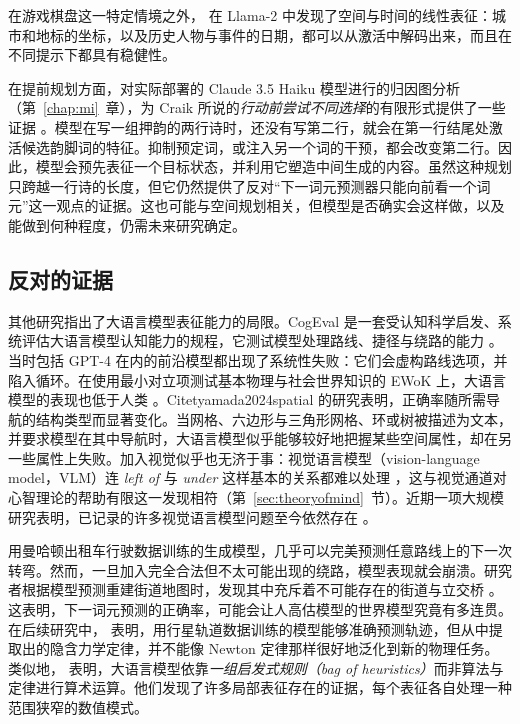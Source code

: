 在游戏棋盘这一特定情境之外，\citet{gurnee2024language} 在 Llama-2 中发现了空间与时间的线性表征：城市和地标的坐标，以及历史人物与事件的日期，都可以从激活中解码出来，而且在不同提示下都具有稳健性。

在提前规划方面，对实际部署的 Claude 3.5 Haiku 模型进行的归因图分析（第~\ref{chap:mi}~章），为 Craik 所说的\emph{行动前尝试不同选择}的有限形式提供了一些证据 \citep{lindsey2025biology}。模型在写一组押韵的两行诗时，还没有写第二行，就会在第一行结尾处激活候选韵脚词的特征。抑制预定词，或注入另一个词的干预，都会改变第二行。因此，模型会预先表征一个目标状态，并利用它塑造中间生成的内容。虽然这种规划只跨越一行诗的长度，但它仍然提供了反对“下一词元预测器只能向前看一个词元”这一观点的证据。这也可能与空间规划相关，但模型是否确实会这样做，以及能做到何种程度，仍需未来研究确定。

\subsection{反对的证据}
其他研究指出了大语言模型表征能力的局限。CogEval 是一套受认知科学启发、系统评估大语言模型认知能力的规程，它测试模型处理路线、捷径与绕路的能力 \citep{momennejad2023cogmap}。当时包括 GPT-4 在内的前沿模型都出现了系统性失败：它们会虚构路线选项，并陷入循环。在使用最小对立项测试基本物理与社会世界知识的 EWoK 上，大语言模型的表现也低于人类 \citep{ivanova2025elementsworldknowledgeewok}。Citet{yamada2024spatial} 的研究表明，正确率随所需导航的结构类型而显著变化。当网格、六边形与三角形网格、环或树被描述为文本，并要求模型在其中导航时，大语言模型似乎能够较好地把握某些空间属性，却在另一些属性上失败。加入视觉似乎也无济于事：视觉语言模型（vision-language model，VLM）连 {\em left of} 与 {\em under} 这样基本的关系都难以处理 \citep{kamath2023whats}，这与视觉通道对心智理论的帮助有限这一发现相符（第~\ref{sec:theoryofmind}~节）。近期一项大规模研究表明，已记录的许多视觉语言模型问题至今依然存在 \citep{wang2026monos}。

用曼哈顿出租车行驶数据训练的生成模型，几乎可以完美预测任意路线上的下一次转弯。然而，一旦加入完全合法但不太可能出现的绕路，模型表现就会崩溃。研究者根据模型预测重建街道地图时，发现其中充斥着不可能存在的街道与立交桥 \citep{vafa2024eval}。这表明，下一词元预测的正确率，可能会让人高估模型的世界模型究竟有多连贯。在后续研究中，\citet{vafa2025foundation} 表明，用行星轨道数据训练的模型能够准确预测轨迹，但从中提取出的隐含力学定律，并不能像 Newton 定律那样很好地泛化到新的物理任务。类似地，\citet{nikankin2025arith} 表明，大语言模型依靠{\em 一组启发式规则（bag of heuristics）}而非算法与定律进行算术运算。他们发现了许多局部表征存在的证据，每个表征各自处理一种范围狭窄的数值模式。




